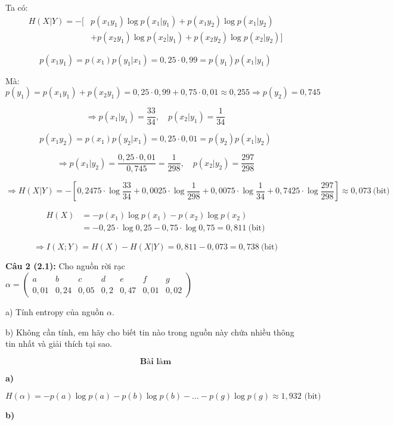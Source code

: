 \documentclass[12pt]{article}
\begin{document}
Ta có: 
\[
\begin{aligned}
H(X|Y) = -[ &p(x_1 y_1)\log p(x_1 |y_1) + p(x_1 y_2)\log p(x_1 |y_2) \\
&+ p(x_2 y_1)\log p(x_2 |y_1) + p(x_2 y_2)\log p(x_2 |y_2)]
\end{aligned}
\]

\[
p(x_1 y_1) = p(x_1) p(y_1|x_1) = 0{,}25 \cdot 0{,}99 = p(y_1) p(x_1|y_1)
\]

Mà:
\[
p(y_1) = p(x_1 y_1) + p(x_2 y_1) = 0{,}25 \cdot 0{,}99 + 0{,}75 \cdot 0{,}01 \approx 0{,}255 
\Rightarrow p(y_2) = 0{,}745
\]

\[
\Rightarrow p(x_1|y_1) = \frac{33}{34}, \quad p(x_2|y_1) = \frac{1}{34}
\]

\[
p(x_1 y_2) = p(x_1) p(y_2|x_1) = 0{,}25 \cdot 0{,}01 = p(y_2) p(x_1|y_2)
\]

\[
\Rightarrow p(x_1|y_2) = \frac{0{,}25 \cdot 0{,}01}{0{,}745} = \frac{1}{298}, \quad
p(x_2|y_2) = \frac{297}{298}
\]

\[
\Rightarrow H(X|Y) = - \left[
0{,}2475 \cdot \log \frac{33}{34} +
0{,}0025 \cdot \log \frac{1}{298} +
0{,}0075 \cdot \log \frac{1}{34} +
0{,}7425 \cdot \log \frac{297}{298}
\right] \approx 0{,}073\ \text{(bit)}
\]

\[
\begin{aligned}
H(X) &= - p(x_1)\log p(x_1) - p(x_2)\log p(x_2) \\
&= -0{,}25 \cdot \log 0{,}25 - 0{,}75 \cdot \log 0{,}75 = 0{,}811\ \text{(bit)}
\end{aligned}
\]

\[
\Rightarrow I(X;Y) = H(X) - H(X|Y) = 0{,}811 - 0{,}073 = 0{,}738\ \text{(bit)}
\]

\newpage
\textbf{Câu 2 (2.1):} Cho nguồn rời rạc $\alpha = \left( 
\begin{array}{ccccccc}
a & b & c & d & e & f & g \\
0{,}01 & 0{,}24 & 0{,}05 & 0{,}2 & 0{,}47 & 0{,}01 & 0{,}02
\end{array}
\right)$

a) Tính entropy của nguồn $\alpha$.

b) Không cần tính, em hãy cho biết tin nào trong nguồn này chứa nhiều thông tin nhất và giải thích tại sao.

\[
\textbf{Bài làm}
\]

\textbf{a)}

\[
H(\alpha) = - p(a)\log p(a) - p(b)\log p(b) - \dots - p(g)\log p(g) \approx 1{,}932 \text{ (bit)}
\]

\textbf{b)}
\end{document}
